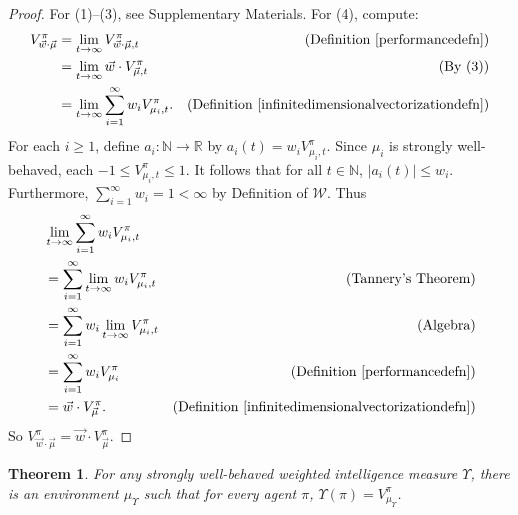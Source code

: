 \documentclass[twoside]{article}
\newtheorem{theorem}{Theorem}
\begin{document}
\begin{proof}
    For (1)--(3), see Supplementary Materials. For (4), compute:
    \begin{align*}
        V^\pi_{\vec w\cdot\vec\mu}
            &= \lim_{t\to\infty} V^\pi_{\vec w\cdot \vec\mu,t}
                &\mbox{(Definition \ref{performancedefn})}\\
            &= \lim_{t\to\infty} \vec w\cdot V^\pi_{\vec\mu,t}
                &\mbox{(By (3))}\\
            &= \lim_{t\to\infty} \sum_{i=1}^\infty w_i V^\pi_{\mu_i,t}.
                &\mbox{(Definition \ref{infinitedimensionalvectorizationdefn})}
    \end{align*}
    For each $i\geq 1$, define $a_i:\mathbb N\to\mathbb R$
    by $a_i(t)=w_iV^\pi_{\mu_i,t}$.
    Since $\mu_i$ is strongly well-behaved, each $-1\leq V^\pi_{\mu_i,t}\leq 1$.
    It follows that for all $t\in\mathbb N$, $|a_i(t)|\leq w_i$.
    Furthermore, $\sum_{i=1}^\infty w_i=1<\infty$
    by Definition of $\mathscr W$. Thus
    \begin{align*}
        &{} \lim_{t\to\infty} \sum_{i=1}^\infty w_iV^\pi_{\mu_i,t}\\
            &= \sum_{i=1}^\infty\lim_{t\to\infty} w_iV^\pi_{\mu_i,t}
                &\mbox{(Tannery's Theorem)}\\
            &= \sum_{i=1}^\infty w_i\lim_{t\to\infty} V^\pi_{\mu_i,t}
                &\mbox{(Algebra)}\\
            &= \sum_{i=1}^\infty w_iV^\pi_{\mu_i}
                &\mbox{(Definition \ref{performancedefn})}\\
            &= \vec w\cdot V^\pi_{\vec\mu}.
                &\mbox{(Definition \ref{infinitedimensionalvectorizationdefn})}
    \end{align*}
    So $V^\pi_{\vec w\cdot\vec\mu}=\vec w\cdot V^\pi_{\vec\mu}$.
\end{proof}

\begin{theorem}
\label{universalenvtheorem}
    For any strongly well-behaved weighted intelligence measure $\Upsilon$,
    there is an environment $\mu_\Upsilon$ such that for every agent $\pi$,
    $\Upsilon(\pi)=V^\pi_{\mu_\Upsilon}$.
\end{theorem}
\end{document}

